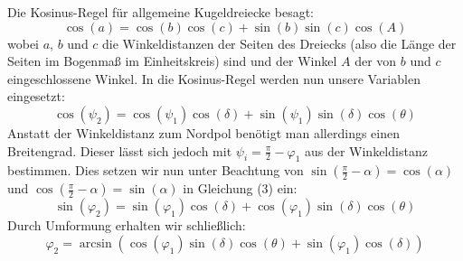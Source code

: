 Die Kosinus-Regel für allgemeine Kugeldreiecke besagt:
$$
\cos(a) = \cos(b)\cos(c) + \sin(b)\sin(c)\cos(A)
$$
wobei $a$, $b$ und $c$ die Winkeldistanzen der Seiten des Dreiecks (also die Länge der Seiten im Bogenmaß im Einheitskreis) sind und der Winkel $A$ der von $b$ und $c$ eingeschlossene Winkel. In die Kosinus-Regel werden nun unsere Variablen eingesetzt:
\begin{equation}
\tag{3}
\cos(\psi_2) = \cos(\psi_1)\cos(\delta) + \sin(\psi_1)\sin(\delta)\cos(\theta)
\end{equation}
Anstatt der Winkeldistanz zum Nordpol benötigt man allerdings einen Breitengrad. Dieser lässt sich jedoch mit $\psi_i = \frac{\pi}{2} - \varphi_1$ aus der Winkeldistanz bestimmen. Dies setzen wir nun unter Beachtung von $\sin(\frac{\pi}{2} - \alpha) = \cos(\alpha)$ und $\cos(\frac{\pi}{2} - \alpha) = \sin(\alpha)$ in Gleichung (3) ein:
\begin{equation}
\tag{3'}
\sin(\varphi_2) = \sin(\varphi_1)\cos(\delta) + \cos(\varphi_1)\sin(\delta)\cos(\theta)
\end{equation}
Durch Umformung erhalten wir schließlich:
\begin{equation}
\tag{1}
\varphi_2 = \arcsin\left(
\cos(\varphi_1)\sin(\delta)\cos(\theta) + \sin(\varphi_1)\cos(\delta)
\right)
\end{equation}

